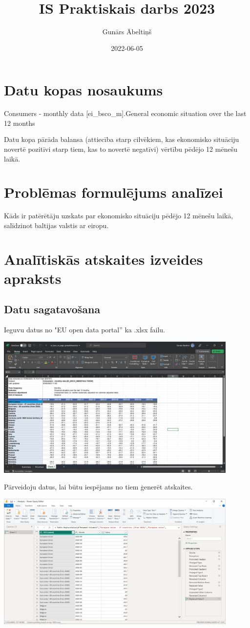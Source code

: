 \documentclass{article}
\title{IS Praktiskais darbs 2023}
\author{Gunārs Ābeltiņš}
\date{2022-06-05}
\begin{document}
\maketitle

\section{Datu kopas nosaukums}
Consumers - monthly data [ei\_bsco\_m].General economic situation over the last 12 months

Datu kopa pārāda balansa (attiecība starp cilvēkiem, kas ekonomisko situāciju novertē pozitīvi starp tiem, kas to novertē negatīvi) vērtību pēdējo 12 mēnešu laikā.

\section{Problēmas formulējums analīzei}
Kāds ir patērētāju uzskats par ekonomisko situāciju pēdējo 12 mēnešu laikā, salīdzinot baltijas valstis ar eiropu.

\section{Analītiskās atskaites izveides apraksts}
\subsection{Datu sagatavošana}
Ieguvu datus no "EU open data portal” ka .xlsx failu.

\includegraphics[width=0.9\textwidth, center]{Excel}

Pārveidoju datus, lai būtu iespējams no tiem ģenerēt atskaites.

\includegraphics[width=0.9\textwidth, center]{Transform}
\end{document}
